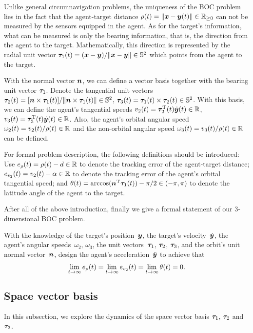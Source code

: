 \documentclass[5p,authoryear,preprint]{elsarticle}\linenofalse
\begin{document}
Unlike general circumnavigation problems, the uniqueness of the BOC problem lies in the fact that the agent-target distance $\rho(t)=\|\bm{x}-\bm{y}(t)\|\in\mathbb{R}_{\ge0}$ can not be measured by the sensors equipped in the agent.
As for the target's information, what can be measured is only the bearing information, 
that is, the direction from the agent to the target.
Mathematically, this direction is represented by the radial unit vector $\bm{\tau}_1(t)=(\bm{x}-\bm{y})/\|\bm{x}-\bm{y}\|\in\mathbb{S}^2$ which points from the agent to the target.

With the normal vector $\bm{n}$, we can define a vector basis together with the bearing unit vector $\bm{\tau}_1$.
Denote the tangential unit vectors $\bm{\tau}_2(t)=[\bm{n}\times\bm{\tau}_1(t)]/\|\bm{n}\times\bm{\tau}_1(t)\|\in\mathbb{S}^2$,
$\bm{\tau}_3(t)=\bm{\tau}_1(t)\times\bm{\tau}_2(t)\in\mathbb{S}^2$.
With this basis, we can define the agent's tangential speeds $v_2(t)=\bm{\tau}_2^\mathrm{T}(t)\dot{\bm{y}}(t)\in\mathbb{R}$, $v_3(t)=\bm{\tau}_3^\mathrm{T}(t)\dot{\bm{y}}(t)\in\mathbb{R}$.
Also, the agent's orbital angular speed $\omega_2(t)=v_2(t)/\rho(t)\in\mathbb{R}$ and the non-orbital angular speed $\omega_3(t)=v_3(t)/\rho(t)\in\mathbb{R}$ can be defined.

For formal problem description, the following definitions should be introduced:
Use $e_\rho(t)=\rho(t)-d\in\mathbb{R}$ to denote the tracking error of the agent-target distance;
$e_{v_2}(t)=v_2(t)-\alpha\in\mathbb{R}$ to denote the tracking error of the agent's orbital tangential speed;
and $\theta(t)=\arccos(\bm{n}^\mathrm{T}\bm{\tau}_1(t))-\pi/2\in(-\pi,\pi)$ to denote the latitude angle of the agent to the target.

After all of the above introduction, finally we give a formal statement of our 3-dimensional BOC problem.

\begin{problem}\label{prb:BOC}
With the knowledge of the target's position~$\bm{y}$, the target's velocity~$\dot{\bm{y}}$, the agent's angular speeds~$\omega_2$, $\omega_3$, the unit vectors~$\bm{\tau}_1$, $\bm{\tau}_2$, $\bm{\tau}_3$, and the orbit's unit normal vector~$\bm{n}$, design the agent's acceleration~$\ddot{\bm{y}}$ to achieve that
\[
\lim_{t\to\infty}e_\rho(t)=\lim_{t\to\infty}e_{v_2}(t)=\lim_{t\to\infty}\theta(t)=0.
\]
\end{problem}

\subsection{Space vector basis}

In this subsection, we explore the dynamics of the space vector basis $\bm{\tau}_1$, $\bm{\tau}_2$ and $\bm{\tau}_3$.
\end{document}

